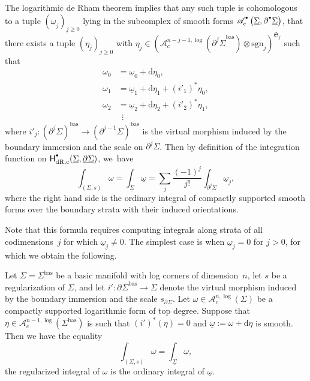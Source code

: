 \documentclass[10pt]{amsart}
\let\oldbullet\bullet
\renewcommand{\bullet}{{\raisebox{1pt}{$\scriptscriptstyle\oldbullet$}}}
\theoremstyle{definition}
\theoremstyle{remark}
\renewcommand{\ge}{\geqslant}
\newcommand{\uomega}{\underline{\omega}}
\newcommand{\rbrac}[1]{\left(#1\right)}
\newcommand{\dd}{\mathrm{d}}
\newcommand{\Ac}[2][\bullet]{\mathscr{A}_c^{#1}\rbrac{#2}}
\newcommand{\Alogc}[2][\bullet]{\mathscr{A}^{#1,\log}_c(#2)}
\newcommand{\Sig}{\Sigma}
\newcommand{\uSig}{\underline{\Sigma}}
\newcommand{\bas}[1]{{#1}^{\mathrm{bas}}}
\newcommand{\Sigbas}{\bas{\Sig}}
\newcommand{\ubdSig}[1][]{\underline{\partial^{#1}\Sigma}}
\newcommand{\bdSig}[1][]{\partial^{#1}\Sigma}
\newcommand{\HdRc}[2][\bullet]{\mathsf{H}_{\mathrm{dR},\mathrm{c}}^{#1}(#2)}
\newcommand{\symgp}[1]{\mathfrak{S}_{#1}}
\newcommand{\sgn}[1]{\mathrm{sgn}_{#1}}
\begin{document}
The logarithmic de Rham theorem implies that any such tuple is cohomologous to a tuple $(\uomega_j)_{j \ge0}$ lying in the subcomplex of smooth forms $\Ac{\uSig,\partial^\bullet\uSig}$, \ie that there exists a tuple $(\eta_j)_{j \ge 0}$ with $\eta_j \in (\Alogc[n-j-1]{\bas{\bdSig[j]}}\otimes \sgn{j})^{\symgp{j}}$ such that
\begin{align*}
\omega_0 &= \uomega_0 + \dd \eta_0, \\
\omega_1 &= \uomega_1 + \dd \eta_1 + (i'_1)^*\eta_0, \\
\omega_2 &= \uomega_2 + \dd \eta_2 + (i'_2)^*\eta_1, \\
&\ \ \vdots
\end{align*}
where $i'_j : \bas{(\bdSig[j])} \to \bas{(\bdSig[j-1])}$ is the virtual morphism induced by the boundary immersion and the scale on $\bdSig[j]$. Then by definition of the integration function on $\HdRc{\uSig,\ubdSig}$, we~have
\[
\int_{(\Sig,s)} \omega = \int_{\uSig} \uomega = \sum_j \frac{(-1)^j}{j!} \int_{\ubdSig[j]} \uomega_j,
\]
where the right hand side is the ordinary integral of compactly supported smooth forms over the boundary strata with their induced orientations.

Note that this formula requires computing integrals along strata of all codimensions~$j$ for which $\uomega_j \neq 0$. The simplest case is when $\uomega_j =0$ for $j >0$, for which we obtain the following.

\begin{proposition}\label{lem:how-to-compute-regularized-integral}
Let $\Sig = \Sigbas$ be a basic manifold with log corners of dimension~$n$, let $s$ be a regularization of $\Sig$, and let $i' : \bas{\bdSig} \to \Sig$ denote the virtual morphism induced by the boundary immersion and the scale $s_{\bdSig}$. Let $\omega \in \Alogc[n]{\Sig}$ be a compactly supported logarithmic form of top degree. Suppose that $\eta\in \Alogc[n-1]{\Sigbas}$ is such that $(i')^*(\eta)=0$ and $\uomega := \omega + \dd \eta$ is smooth. Then we have the equality
\[
\int_{(\Sig,s)}\omega = \int_{\uSig}\underline{\omega},
\]
\ie the regularized integral of $\omega$ is the ordinary integral of $\uomega$.
\end{proposition}
\end{document}
